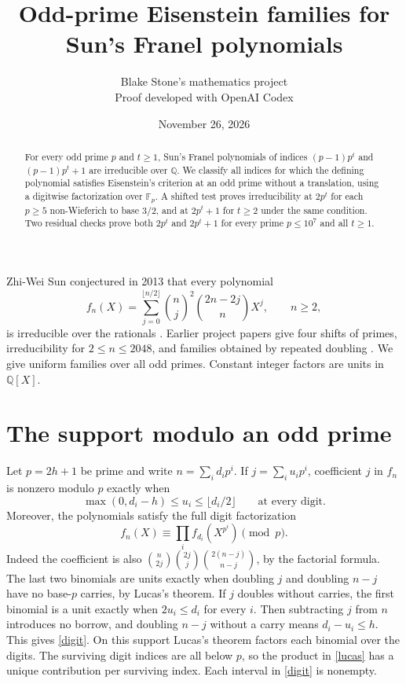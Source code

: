 \documentclass[11pt]{article}
\title{Odd-prime Eisenstein families for Sun's Franel polynomials}
\author{Blake Stone's mathematics project\\\small Proof developed with OpenAI Codex}
\date{November 26, 2026}
\begin{document}
\maketitle
\begin{abstract}
For every odd prime $p$ and $t\ge1$, Sun's Franel polynomials of indices $(p-1)p^t$ and $(p-1)p^t+1$ are irreducible over $\mathbb Q$. We classify all indices for which the defining polynomial satisfies Eisenstein's criterion at an odd prime without a translation, using a digitwise factorization over $\mathbb F_p$. A shifted test proves irreducibility at $2p^t$ for each $p\ge5$ non-Wieferich to base $3/2$, and at $2p^t+1$ for $t\ge2$ under the same condition. Two residual checks prove both $2p^t$ and $2p^t+1$ for every prime $p\le10^7$ and all $t\ge1$.
\end{abstract}

Zhi-Wei Sun conjectured in 2013 that every polynomial
\[
 f_n(X)=\sum_{j=0}^{\lfloor n/2\rfloor}\binom nj^2\binom{2n-2j}{n}X^j,
 \qquad n\ge2,
\]
is irreducible over the rationals \cite{sun}. Earlier project papers give four shifts of primes, irreducibility for $2\le n\le2048$, and families obtained by repeated doubling \cite{earlier}. We give uniform families over all odd primes. Constant integer factors are units in $\mathbb Q[X]$.

\section{The support modulo an odd prime}
Let $p=2h+1$ be prime and write $n=\sum_i d_i p^i$. If $j=\sum_i u_i p^i$, coefficient $j$ in $f_n$ is nonzero modulo $p$ exactly when
\begin{equation}\label{digit}
 \max(0,d_i-h)\le u_i\le\lfloor d_i/2\rfloor \qquad\text{at every digit.}
\end{equation}
Moreover, the polynomials satisfy the full digit factorization
\begin{equation}\label{lucas}
 f_n(X)\equiv\prod_i f_{d_i}(X^{p^i})\pmod p .
\end{equation}
Indeed the coefficient is also $\binom n{2j}\binom{2j}j\binom{2(n-j)}{n-j}$, by the factorial formula. The last two binomials are units exactly when doubling $j$ and doubling $n-j$ have no base-$p$ carries, by Lucas's theorem. If $j$ doubles without carries, the first binomial is a unit exactly when $2u_i\le d_i$ for every $i$. Then subtracting $j$ from $n$ introduces no borrow, and doubling $n-j$ without a carry means $d_i-u_i\le h$. This gives \eqref{digit}. On this support Lucas's theorem factors each binomial over the digits. The surviving digit indices are all below $p$, so the product in \eqref{lucas} has a unique contribution per surviving index. Each interval in \eqref{digit} is nonempty.
\end{document}

